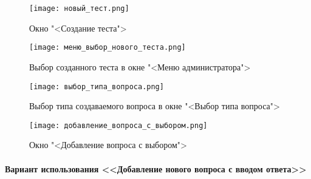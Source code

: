 \begin{figure}[H]
	\centering
	\texttt{[image: новый\_тест.png]}
	\caption{Окно "<Создание теста">}
	\label{new_test_window:image}
\end{figure}
\begin{figure}[H]
	\centering
	\texttt{[image: меню\_выбор\_нового\_теста.png]}
	\caption{Выбор созданного теста в окне "<Меню администратора">}
	\label{menu_new_test_window:image}
\end{figure}
\begin{figure}[H]
	\centering
	\texttt{[image: выбор\_типа\_вопроса.png]}
	\caption{Выбор типа создаваемого вопроса в окне "<Выбор типа вопроса">}
	\label{question_selection:image}
\end{figure}
\begin{figure}[H]
	\centering
	\texttt{[image: добавление\_вопроса\_с\_выбором.png]}
	\caption{Окно "<Добавление вопроса с выбором">}
	\label{radio_question:image}
\end{figure}

\paragraph{Вариант использования <<Добавление нового вопроса с вводом ответа>>}

